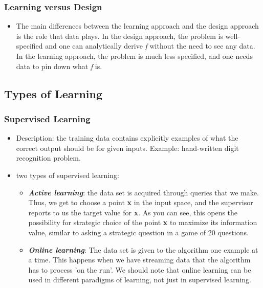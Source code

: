 \documentclass[11pt]{article}
\theoremstyle{definition}
\begin{document}
\subsubsection{Learning versus Design}
\begin{itemize}[noitemsep, topsep=0pt]
    \item The main differences between the learning approach and the design approach is the role that data plays. In the design approach, the problem is well-specified and one can analytically derive \textit{f} without the need to see any data. In the learning approach, the problem is much less specified, and one needs data to pin down what \textit{f} is.
\end{itemize}

\subsection{Types of Learning}
\subsubsection{Supervised Learning}
\begin{itemize}[noitemsep, topsep=0pt]
    \item Description: the training data contains explicitly examples of what the correct output should be for given inputs. Example: hand-written digit recognition problem.
    \item two types of supervised learning:
    \begin{itemize}[noitemsep, topsep=0pt]
        \item \textbf{\textit{Active learning}}: the data set is acquired through queries that we make. Thus, we get to choose a point \textbf{x} in the input space, and the supervisor reports to us the target value for \textbf{x}. As you can see, this opens the possibility for strategic choice of the point \textbf{x} to maximize its information value, similar to asking a strategic question in a game of 20 questions.
        \item \textbf{\textit{Online learning}}: The data set is given to the algorithm one example at a time. This happens when we have streaming data that the algorithm has to process 'on the run'. We should note that online learning can be used in different paradigms of learning, not just in supervised learning.
    \end{itemize}
\end{itemize}
\end{document}
